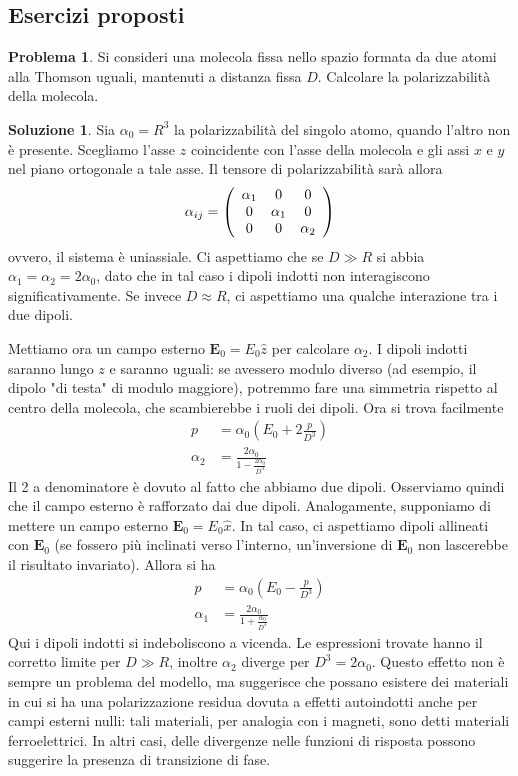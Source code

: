\documentclass[a4paper,11pt]{book}
\renewcommand{\vec}[1]{\mathbf{#1}}
\theoremstyle{theorem}
\theoremstyle{definition}
\newtheorem{problema}{Problema}[section]
\newtheorem{soluzione}{Soluzione}[section]
\begin{document}
\subsection{Esercizi proposti}
\begin{problema}
	Si consideri una molecola fissa nello spazio formata da due atomi alla Thomson uguali, mantenuti a distanza fissa $D$. Calcolare la polarizzabilità della molecola.
\end{problema}
\begin{soluzione}
	Sia $\alpha_0=R^3$ la polarizzabilità del singolo atomo, quando l'altro non è presente. Scegliamo l'asse $z$ coincidente con l'asse della molecola e gli assi $x$ e $y$ nel piano ortogonale a tale asse. Il tensore di polarizzabilità sarà allora
	\[\alpha_{ij}=\left(\begin{array}{c c c}
	\alpha_{1}&0&0\\0&\alpha_{1}&0\\0&0&\alpha_{2}
	\end{array}\right)\]
	ovvero, il sistema è uniassiale. Ci aspettiamo che se $D\gg R$ si abbia $\alpha_1=\alpha_2=2\alpha_0$, dato che in tal caso i dipoli indotti non interagiscono significativamente. Se invece $D\approx R$, ci aspettiamo una qualche interazione tra i due dipoli.

	\noindent Mettiamo ora un campo esterno $\vec{E}_0=E_0\hat{z}$ per calcolare $\alpha_2$. I dipoli indotti saranno lungo $z$ e saranno uguali: se avessero modulo diverso (ad esempio, il dipolo "di testa" di modulo maggiore), potremmo fare una simmetria rispetto al centro della molecola, che scambierebbe i ruoli dei dipoli. Ora si trova facilmente
	\begin{align*}p&=\alpha_0\left(E_0+2\frac{p}{D^3}\right)\\\alpha_2&=\frac{2\alpha_0}{1-\frac{2\alpha_0}{D^3}}\end{align*}
	Il 2 a denominatore è dovuto al fatto che abbiamo due dipoli. Osserviamo quindi che il campo esterno è rafforzato dai due dipoli. Analogamente, supponiamo di mettere un campo esterno $\vec{E}_0=E_0\hat{x}$. In tal caso, ci aspettiamo dipoli allineati con $\vec{E}_0$ (se fossero più inclinati verso l'interno, un'inversione di $\vec{E}_0$ non lascerebbe il risultato invariato). Allora si ha
	\begin{align*}
		p&=\alpha_0(E_0-\frac{p}{D^3})\\\alpha_1&=\frac{2\alpha_0}{1+\frac{\alpha_0}{D^3}}
	\end{align*}
	Qui i dipoli indotti si indeboliscono a vicenda. Le espressioni trovate hanno il corretto limite per $D\gg R$, inoltre $\alpha_2$ diverge per $D^3=2\alpha_0$. Questo effetto non è sempre un problema del modello, ma suggerisce che possano esistere dei materiali in cui si ha una polarizzazione residua dovuta a effetti autoindotti anche per campi esterni nulli: tali materiali, per analogia con i magneti, sono detti materiali ferroelettrici. In altri casi, delle divergenze nelle funzioni di risposta possono suggerire la presenza di transizione di fase.
\end{soluzione}
\end{document}
